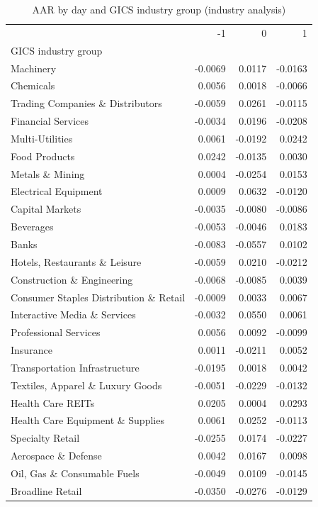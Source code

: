 \begin{table}
\caption{AAR by day and GICS industry group (industry analysis)}
\label{tab:industry_aar}
\begin{tabular}{lrrr}
\toprule
 & -1 & 0 & 1 \\
GICS industry group &  &  &  \\
\midrule
Machinery & -0.0069 & 0.0117 & -0.0163 \\
Chemicals & 0.0056 & 0.0018 & -0.0066 \\
Trading Companies \& Distributors & -0.0059 & 0.0261 & -0.0115 \\
Financial Services & -0.0034 & 0.0196 & -0.0208 \\
Multi-Utilities & 0.0061 & -0.0192 & 0.0242 \\
Food Products & 0.0242 & -0.0135 & 0.0030 \\
Metals \& Mining & 0.0004 & -0.0254 & 0.0153 \\
Electrical Equipment & 0.0009 & 0.0632 & -0.0120 \\
Capital Markets & -0.0035 & -0.0080 & -0.0086 \\
Beverages & -0.0053 & -0.0046 & 0.0183 \\
Banks & -0.0083 & -0.0557 & 0.0102 \\
Hotels, Restaurants \& Leisure & -0.0059 & 0.0210 & -0.0212 \\
Construction \& Engineering & -0.0068 & -0.0085 & 0.0039 \\
Consumer Staples Distribution \& Retail & -0.0009 & 0.0033 & 0.0067 \\
Interactive Media \& Services & -0.0032 & 0.0550 & 0.0061 \\
Professional Services & 0.0056 & 0.0092 & -0.0099 \\
Insurance & 0.0011 & -0.0211 & 0.0052 \\
Transportation Infrastructure & -0.0195 & 0.0018 & 0.0042 \\
Textiles, Apparel \& Luxury Goods & -0.0051 & -0.0229 & -0.0132 \\
Health Care REITs & 0.0205 & 0.0004 & 0.0293 \\
Health Care Equipment \& Supplies & 0.0061 & 0.0252 & -0.0113 \\
Specialty Retail & -0.0255 & 0.0174 & -0.0227 \\
Aerospace \& Defense & 0.0042 & 0.0167 & 0.0098 \\
Oil, Gas \& Consumable Fuels & -0.0049 & 0.0109 & -0.0145 \\
Broadline Retail & -0.0350 & -0.0276 & -0.0129 \\

\end{tabular}
\end{table}
